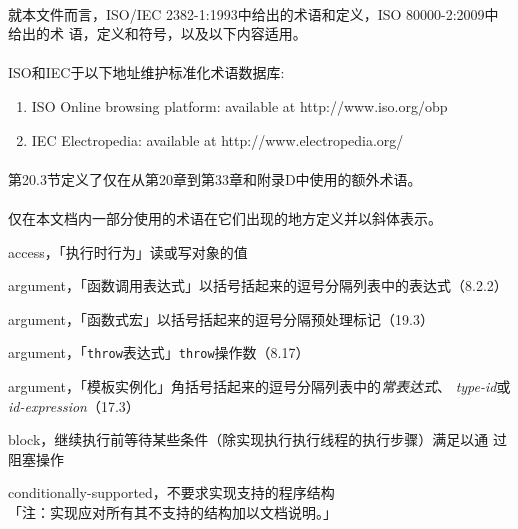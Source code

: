 \paragraph{}
就本文件而言，ISO/IEC 2382-1:1993中给出的术语和定义，ISO 80000-2:2009中给出的术
语，定义和符号，以及以下内容适用。

\paragraph{}
ISO和IEC于以下地址维护标准化术语数据库:
\begin{enumerate}
  \item{ISO Online browsing platform: available at http://www.iso.org/obp}
  \item{IEC Electropedia: available at http://www.electropedia.org/}
\end{enumerate}

\paragraph{}
第20.3节定义了仅在从第20章到第33章和附录D中使用的额外术语。

\paragraph{}
仅在本文档内一部分使用的术语在它们出现的地方定义并以斜体表示。


\noindent access，「执行时行为」读或写对象的值

\noindent argument，「函数调用表达式」以括号括起来的逗号分隔列表中的表达式（8.2.2）

\noindent argument，「函数式宏」以括号括起来的逗号分隔预处理标记（19.3）

\noindent argument，「\texttt{throw}表达式」\texttt{throw}操作数（8.17）

\noindent argument，「模板实例化」角括号括起来的逗号分隔列表中的\textit{常表达式}、
\textit{type-id}或\textit{id-expression}（17.3）

\noindent block，继续执行前等待某些条件（除实现执行执行线程的执行步骤）满足以通
过阻塞操作

\noindent conditionally-supported，不要求实现支持的程序结构 \\
「注：实现应对所有其不支持的结构加以文档说明。」

